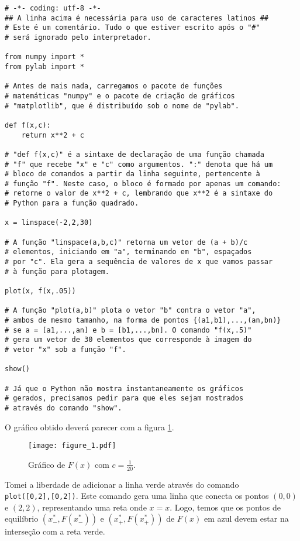 \documentclass{article}
\begin{document}
\begin{verbatim}
# -*- coding: utf-8 -*- 
## A linha acima é necessária para uso de caracteres latinos ##
# Este é um comentário. Tudo o que estiver escrito após o "#"
# será ignorado pelo interpretador.

from numpy import *
from pylab import *

# Antes de mais nada, carregamos o pacote de funções 
# matemáticas "numpy" e o pacote de criação de gráficos 
# "matplotlib", que é distribuído sob o nome de "pylab".

def f(x,c):
    return x**2 + c 

# "def f(x,c)" é a sintaxe de declaração de uma função chamada
# "f" que recebe "x" e "c" como argumentos. ":" denota que há um
# bloco de comandos a partir da linha seguinte, pertencente à
# função "f". Neste caso, o bloco é formado por apenas um comando:
# retorne o valor de x**2 + c, lembrando que x**2 é a sintaxe do
# Python para a função quadrado. 

x = linspace(-2,2,30)

# A função "linspace(a,b,c)" retorna um vetor de (a + b)/c
# elementos, iniciando em "a", terminando em "b", espaçados
# por "c". Ela gera a sequência de valores de x que vamos passar
# à função para plotagem. 

plot(x, f(x,.05))

# A função "plot(a,b)" plota o vetor "b" contra o vetor "a",
# ambos de mesmo tamanho, na forma de pontos {(a1,b1),...,(an,bn)}
# se a = [a1,...,an] e b = [b1,...,bn]. O comando "f(x,.5)"
# gera um vetor de 30 elementos que corresponde à imagem do
# vetor "x" sob a função "f".

show()

# Já que o Python não mostra instantaneamente os gráficos
# gerados, precisamos pedir para que eles sejam mostrados
# através do comando "show". 
\end{verbatim}

O gráfico obtido deverá parecer com a figura \ref{fig1}.

\begin{figure}[h!]
\begin{center}
\texttt{[image: figure\_1.pdf]} 
\caption{Gráfico de $F(x)$ com $c = \frac{1}{20}$.}\label{fig1}
\end{center}
\end{figure}


Tomei a liberdade de adicionar a linha verde através do comando \\
\texttt{plot([0,2],[0,2])}. Este comando gera uma linha que conecta os pontos $(0,0)$ e $(2,2)$, representando uma reta onde $x = x$. Logo, temos que os pontos de equilíbrio $(x^*_-,F(x^*_-))$ e $(x^*_+,F(x^*_+))$ de $F(x)$ em azul devem estar na interseção com a reta verde.
\end{document}
